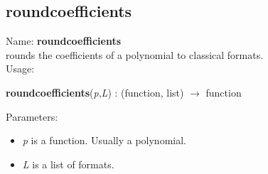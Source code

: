 \subsection{roundcoefficients}
\label{labroundcoefficients}
\noindent Name: \textbf{roundcoefficients}\\
rounds the coefficients of a polynomial to classical formats.\\
\noindent Usage: 
\begin{center}
\textbf{roundcoefficients}(\emph{p},\emph{L}) : (\textsf{function}, \textsf{list}) $\rightarrow$ \textsf{function}\\
\end{center}
Parameters: 
\begin{itemize}
\item \emph{p} is a function. Usually a polynomial.
\item \emph{L} is a list of formats.
\end{itemize}
